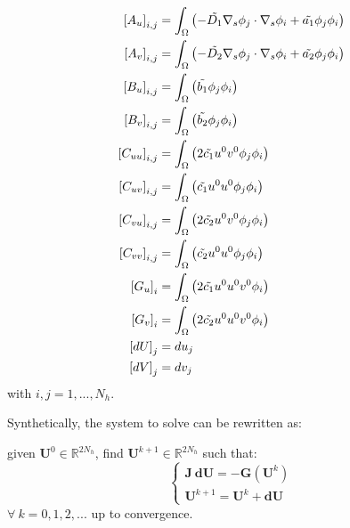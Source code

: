 \begin{equation}\begin{aligned}
    \left[ A_u\right]_{i,j} & = \int_{\Omega} \left( - \Tilde{D_1} \nabla_s \phi_j \cdot \nabla_s \phi_i + \Tilde{a_1} \phi_j \phi_i\right)\\
    \left[ A_v\right]_{i,j} & = \int_{\Omega} \left( - \Tilde{D_2} \nabla_s \phi_j \cdot \nabla_s \phi_i + \Tilde{a_2} \phi_j \phi_i\right)\\
    \left[B_u\right]_{i,j} & = \int_{\Omega} \left( \Tilde{b_1} \phi_j \phi_i \right) \\
    \left[B_v\right]_{i,j} & = \int_{\Omega} \left( \Tilde{b_2} \phi_j \phi_i \right)\\
    \left[ C_{uu}\right]_{i,j} & = \int_\Omega \left( 2 \Tilde{c_1} u^0 v^0 \phi_j \phi_i \right) \\
    \left[ C_{uv}\right]_{i,j} & = \int_\Omega \left( \Tilde{c_1} u^0 u^0 \phi_j \phi_i \right) \\
    \left[ C_{vu}\right]_{i,j} & = \int_\Omega \left( 2 \Tilde{c_2} u^0 v^0 \phi_j \phi_i \right) \\
    \left[ C_{vv}\right]_{i,j} & = \int_\Omega \left( \Tilde{c_2} u^0 u^0 \phi_j \phi_i \right) \\
    \left[ G_u\right]_i & = \int_\Omega \left( 2 \Tilde{c_1} u^0 u^0 v^0 \phi_i \right) \\
    \left[ G_v\right]_i & = \int_\Omega \left( 2 \Tilde{c_2} u^0 u^0 v^0\phi_i \right) \\
    \left[dU\right]_j & = du_j \\
    \left[dV\right]_j & = dv_j
\end{aligned}\end{equation}
with $i,j = 1, ..., N_h$.

Synthetically, the system to solve can be rewritten as:

given $\mathbf{U}^0 \in \mathds{R}^{2N_h}$, find $\mathbf{U}^{k+1} \in \mathds{R}^{2N_h}$ such that:
\begin{equation}
\left\lbrace \begin{matrix}
 \mathbf{J} \ \mathbf{dU} = - \mathbf{G}\left(\mathbf{U}^k\right) \\
 \mathbf{U}^{k+1} = \mathbf{U}^k + \mathbf{dU}
\end{matrix}
\right.
\end{equation}
$\forall \ k = 0,1,2,...$ up to convergence.

